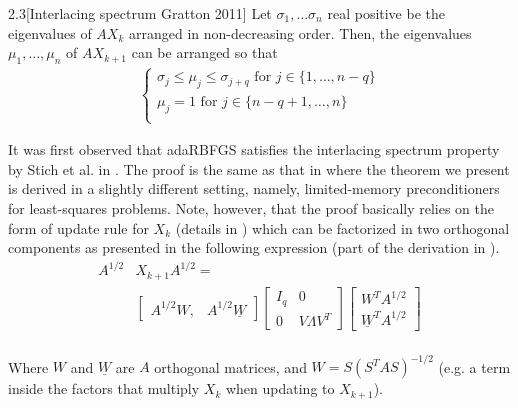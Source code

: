 \documentclass[12pt,conference,compsocconf]{IEEEtran}
\begin{document}
\begin{customthm}{2.3}[Interlacing spectrum Gratton 2011]\label{thm:interlacing}
Let $\sigma_1,\ldots\sigma_n$ real positive be the eigenvalues of $AX_{k}$ arranged in non-decreasing order. Then, the eigenvalues $\mu_1,\ldots,\mu_n$ of $AX_{k+1}$ can be arranged so that\\
\vspace{0mm}
\begin{align}\label{eq:interlacing}
	\left\{
    	\begin{array}{ll}
        	\sigma_j\leq\mu_j\leq\sigma_{j+q}\text{  for } j \in \{1,\ldots,n-q\}\\ 
            \mu_j=1 \text{                           for } j \in\{n-q+1,\ldots,n\}\\
        \end{array}                 
    \right.
\end{align}

\end{customthm}
\vspace{0mm}
It was first observed that adaRBFGS satisfies the interlacing spectrum property by Stich et al. in \cite{Stich1}. The proof is the same as that in \cite{Gratton} where the theorem we present is derived in a slightly different setting, namely, limited-memory preconditioners for least-squares problems. Note, however, that the proof basically relies on the form of update rule for $X_k$ (details in \cite{Gratton}) which can be factorized in two orthogonal components as presented in the following expression (part of the derivation in \cite{Gratton}).
\vspace{-7mm}
\begin{align}\label{eq:compression}
		A^{1/2}&X_{k+1}A^{1/2}
    	=\\ \nonumber
    	&\begin{bmatrix}
    		A^{1/2}W, & A^{1/2}\underline{W}
    	\end{bmatrix}
        \begin{bmatrix}
			I_q & 0\\
    		0 & V\Lambda V^T
		\end{bmatrix}
    	\begin{bmatrix}
    		W^TA^{1/2}\\
        	\underline{W}^TA^{1/2}
    	  \end{bmatrix} \nonumber
\end{align}
\vspace{-5mm}
\\
Where $W$ and $\underline{W}$ are $A$ orthogonal matrices, and $W=S(S^TAS)^{-1/2}$ (e.g. a term inside the factors that multiply $X_k$ when updating to $X_{k+1}$).
\end{document}

